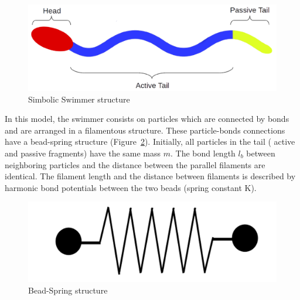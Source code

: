 \begin{figure}[ht]
  \centering
  \begin{footnotesize}
  \includegraphics[scale=0.25]{images/swimmer-struc.png}
  \caption[Simbolic Swimmer Structure]{Simbolic Swimmer structure}
  \label{fig:Bild1}
  \end{footnotesize}
\end{figure} 


In this model, the swimmer consists on particles which are connected by bonds and are arranged in a filamentous structure. These particle-bonds connections have a bead-spring 
structure (Figure~\ref{fig:Bild2.4}). Initially, all particles in the tail ( active and passive fragments) have the same mass $m$. The bond length $l_{b}$ between neighboring
particles and the distance between the parallel filaments are identical. The filament length and the distance between filaments is described by harmonic bond potentials between
the two beads (spring constant K).\par

\begin{figure}[ht]
\centering
  \begin{footnotesize}
  \includegraphics[scale=0.15]{images/bead-spring.png}
  \caption[Bead-Spring Structure]{Bead-Spring structure}
  \label{fig:Bild2.4}
  \end{footnotesize}
\end{figure} 

